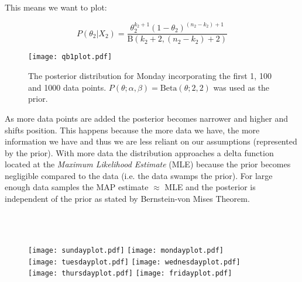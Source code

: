 \documentclass[paper=a4, fontsize=11pt]{scrartcl} %
\numberwithin{equation}{section} %
\numberwithin{figure}{section} %
\numberwithin{table}{section} %
\begin{document}
This means we want to plot:

\begin{equation}
P(\theta_2 | X_2) = \frac{\theta_2^{k_2+1} (1-\theta_2)^{(n_2-k_2)+1}}{\textrm{B}(k_2+2, (n_2-k_2) + 2)}
\end{equation}

\begin{figure}[!h]
\centering
\texttt{[image: qb1plot.pdf]}
  \caption{The posterior distribution for Monday incorporating the first 1, 100 and 1000 data points. $P(\theta ; \alpha, \beta)= \textrm{Beta}(\theta ; 2,2)$ was used as the prior.}
  \label{fig:qbimonposterior}
\end{figure}

As more data points are added the posterior becomes narrower and higher and shifts position. This happens because the more data we have, the more information we have and thus we are less reliant on our assumptions (represented by the prior). With more data the distribution approaches a delta function located at the \textit{Maximum Likelihood Estimate} (MLE) because the prior becomes negligible compared to the data (i.e. the data swamps the prior). For large enough data samples the MAP estimate $\approx$ MLE and the posterior is independent of the prior as stated by Bernstein-von Mises Theorem.\\
\newpage

\\
\\


\begin{figure}[!h]
\centering
\noindent
\texttt{[image: sundayplot.pdf]}%
\texttt{[image: mondayplot.pdf]}\\%
\texttt{[image: tuesdayplot.pdf]}%
\texttt{[image: wednesdayplot.pdf]}\\%
\texttt{[image: thursdayplot.pdf]}%
\texttt{[image: fridayplot.pdf]}\\%

\end{figure}
\end{document}
